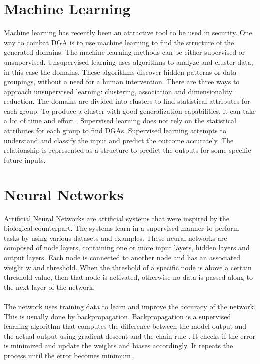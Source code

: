 \section{Machine Learning}
Machine learning has recently been an attractive tool to be used in security. One way to combat DGA is to use machine learning to find the structure of the generated domains. The machine learning methods can be either supervised or unsupervised. Unsupervised learning uses algorithms to analyze and cluster data, in this case the domains. These algorithms discover hidden patterns or data groupings, without a need for a human intervention. There are three ways to approach unsupervised learning: clustering, association and dimensionality reduction. The domains are divided into clusters to find statistical attributes for each group. To produce a cluster with good generalization capabilities, it can take a lot of time and  effort \cite{Unsupervised}. Supervised learning does not rely on the statistical attributes  for each group to find DGAs. Supervised learning attempts to understand and classify the input and predict the outcome accurately. The relationship is represented as a structure to predict the outputs for some specific future inputs.

\section{Neural Networks}
Artificial Neural Networks are artificial systems that were inspired by the biological counterpart. The systems learn in a supervised manner to perform tasks by using various datasets and examples. These neural networks are composed of node layers, containing one or more input layers, hidden layers and output layers. Each node is connected to another node and has an associated weight w and threshold. When the threshold of a specific node is above a certain threshold value, then that node is activated, otherwise no data is passed along to the next layer of the network. \\\\ 
The network uses training data to learn and improve the accuracy of the network. This is usually done by backpropagation. Backpropagation is a supervised learning algorithm that computes the difference between the model output and the actual output using gradient descent and the chain rule . It checks if the error is minimized and update the weights and biases accordingly. It repeats the process until the error becomes minimum \cite{Gradient_Descent}.

